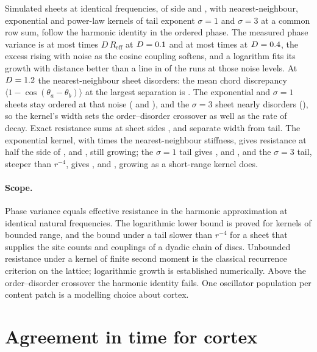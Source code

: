 \documentclass[12pt]{article}
\begin{document}
Simulated sheets at identical frequencies, of side \uSideSmall{} and
\uSideLarge{}, with nearest-neighbour, exponential and power-law kernels of
tail exponent $\sigma=1$ and $\sigma=3$ at a common row sum, follow the harmonic
identity in the ordered phase. The measured phase variance is at most
\uHarmonicRatioLow{} times $D\,R_{\mathrm{eff}}$ at $D=0.1$ and at most
\uHarmonicRatioMid{} times at $D=0.4$, the excess rising with noise as
the cosine coupling softens, and a logarithm fits its growth with distance
better than a line in \uLogarithmicRuns{} of the \uOrderedRuns{} runs at those
noise levels. At $D=1.2$ the nearest-neighbour sheet disorders: the
mean chord discrepancy $\langle 1-\cos(\theta_a-\theta_b)\rangle$ at the
largest separation is \uChordNearestHigh{}. The exponential and $\sigma=1$
sheets stay ordered at that noise (\uChordExponentialHigh{} and
\uChordSigmaOneHigh{}), and the $\sigma=3$ sheet nearly disorders
(\uChordSigmaThreeHigh{}), so the kernel's width sets the order--disorder
crossover as well as the rate of decay. Exact resistance sums at sheet sides
\uScalingSideA{}, \uScalingSideB{} and \uScalingSideC{} separate width from
tail. The exponential kernel, with \uStiffnessRatio{} times the
nearest-neighbour stiffness, gives resistance at half the side of
\uFarExponentialA{}, \uFarExponentialB{} and \uFarExponentialC{}, still
growing; the $\sigma=1$ tail gives \uFarSigmaOneA{}, \uFarSigmaOneB{} and
\uFarSigmaOneC{}, and the $\sigma=3$ tail, steeper than $r^{-4}$, gives
\uFarSigmaThreeA{}, \uFarSigmaThreeB{} and \uFarSigmaThreeC{}, growing as a
short-range kernel does.

\paragraph{Scope.} Phase variance equals effective resistance in the harmonic
approximation at identical natural frequencies. The logarithmic lower bound is
proved for kernels of bounded range, and the bound under a tail slower than
$r^{-4}$ for a sheet that supplies the site counts and couplings of a dyadic
chain of discs. Unbounded resistance under a kernel of finite second moment is
the classical recurrence criterion on the lattice; logarithmic growth is
established numerically. Above the order--disorder crossover the harmonic
identity fails. One oscillator population per content patch is a modelling
choice about cortex.

\section{Agreement in time for cortex}
\label{app:window}
\end{document}
